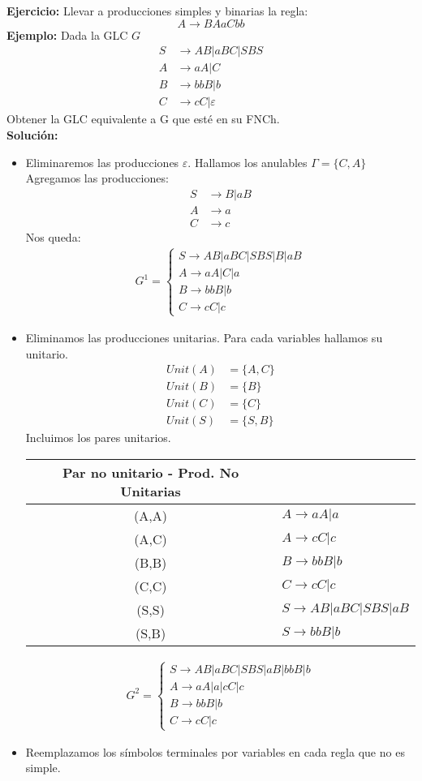 \textbf{Ejercicio: }Llevar a producciones simples y binarias la regla:
$$
A\rightarrow BAaCbb
$$
\textbf{Ejemplo: }Dada la GLC $G$
\begin{align*}
S &\rightarrow AB|aBC|SBS	\\
A &\rightarrow aA|C	\\
B &\rightarrow bbB|b	\\
C &\rightarrow cC|\varepsilon
\end{align*}
Obtener la GLC equivalente a G que esté en su FNCh.\\
\textbf{Solución: }
\begin{itemize}
\item Eliminaremos las producciones $\varepsilon$. Hallamos los anulables $\Gamma =\{C,A\}$
Agregamos las producciones:
\begin{align*}
S &\rightarrow B|aB	\\
A &\rightarrow a	\\
C &\rightarrow c
\end{align*}
Nos queda: 
\begin{align*}
G^1= \left \{ \begin{array}{l}
S\rightarrow AB|aBC|SBS	|B|aB\\
A\rightarrow aA|C|a	\\
B\rightarrow bbB|b	\\
C\rightarrow cC|c\end{array} \right.
\end{align*}
\item Eliminamos las producciones unitarias.
Para cada variables hallamos su unitario.
\begin{align*}
Unit(A)&=\{A,C\}	\\
Unit(B)&=\{B\}	\\
Unit(C)&=\{C\}	\\
Unit(S)&=\{S,B\}
\end{align*}
Incluimos los pares unitarios.

\begin{tabular}{cl}
Par no unitario - Prod. No Unitarias	\\ \hline
(A,A)	&$A\rightarrow aA|a$	\\
(A,C)	&$A\rightarrow cC|c$	\\
(B,B)	&$B\rightarrow bbB|b$	\\
(C,C)	&$C\rightarrow cC|c$	\\
(S,S)	&$S\rightarrow AB|aBC|SBS|aB$	\\
(S,B)	&$S\rightarrow bbB|b$
\end{tabular}
\begin{align*}
G^2= \left \{ \begin{array}{l}
S\rightarrow AB|aBC|SBS|aB|bbB|b	\\
A\rightarrow aA|a|cC|c	\\
B\rightarrow bbB|b	\\
C\rightarrow cC|c\end{array} \right.
\end{align*}
\item Reemplazamos los símbolos terminales por variables en cada regla que no es simple.


\end{itemize}
